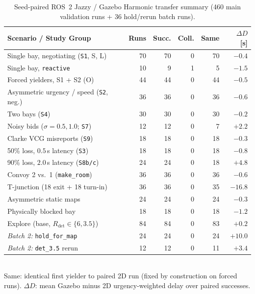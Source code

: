 \begin{table}[!t]\centering
\caption{Seed-paired ROS~2 Jazzy / Gazebo Harmonic transfer summary (460 main validation runs + 36 hold/rerun batch runs).}
\label{tab:gz}
{\footnotesize\setlength{\tabcolsep}{3.0pt}
\begin{tabular}{@{}lrrrrr@{}}\toprule
Scenario / Study Group & Runs & Succ. & Coll. & Same & $\Delta D$ [s] \\\midrule
Single bay, negotiating (\texttt{S1}, S, L) & 70 & 70 & 0 & 70 & $-0.4$ \\
Single bay, \texttt{reactive}               & 10 &  9 & 1 &  5 & $-1.5$ \\
Forced yielders, S1 + S2 (O)             & 44 & 44 & 0 & 44 & $-0.5$ \\
Asymmetric urgency / speed (\texttt{S2}, neg.)    & 36 & 36 & 0 & 36 & $-0.6$ \\
Two bays (\texttt{S4})                      & 30 & 30 & 0 & 30 & $-0.2$ \\
Noisy bids ($\sigma=0.5, 1.0$; \texttt{S7}) & 12 & 12 & 0 &  7 & $+2.2$ \\
Clarke VCG misreports (\texttt{S9})         & 18 & 18 & 0 & 18 & $-0.3$ \\
50\% loss, $0.5$\,s latency (\texttt{S3})   & 18 & 18 & 0 & 18 & $-0.8$ \\
90\% loss, $2.0$\,s latency (\texttt{S8b/c})& 24 & 24 & 0 & 18 & $+4.8$ \\
Convoy 2 vs.\ 1 (\texttt{make\_room})       & 36 & 36 & 0 & 36 & $-0.6$ \\
T-junction (18 exit + 18 turn-in)           & 36 & 36 & 0 & 35 & $-16.8$ \\
Asymmetric static maps                      & 24 & 24 & 0 & 24 & $-0.3$ \\
Physically blocked bay                      & 18 & 18 & 0 & 18 & $-1.2$ \\
Explore (base, $R_{\mathrm{det}}\in\{6,3.5\}$) & 84 & 84 & 0 & 83 & $+0.2$ \\\midrule
\emph{Batch 2:} \texttt{hold\_for\_map}     & 24 & 24 & 0 & 24 & $+10.0$ \\
\emph{Batch 2:} \texttt{det\_3.5} rerun     & 12 & 12 & 0 & 11 & $+3.4$ \\\bottomrule
\end{tabular}}\\[2pt]
{\footnotesize Same: identical first yielder to paired 2D run (fixed by construction on forced runs). $\Delta D$: mean Gazebo minus 2D urgency-weighted delay over paired successes.}
\end{table}

